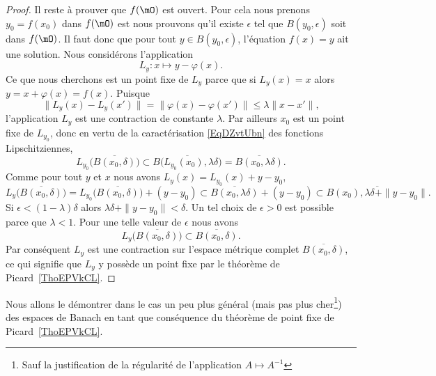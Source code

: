 \begin{proof}
    Il reste à prouver que \( f(\mO)\) est ouvert. Pour cela nous prenons \( y_0=f(x_0)\) dans \( f(\mO)\) est nous prouvons qu'il existe \( \epsilon\) tel que \( B(y_0,\epsilon)\) soit dans \( f(\mO)\). Il faut donc que pour tout \( y\in B(y_0,\epsilon)\), l'équation \( f(x)=y\) ait une solution. Nous considérons l'application
    \begin{equation}
        L_y\colon x\mapsto y-\varphi(x).
    \end{equation}
    Ce que nous cherchons est un point fixe de \( L_y\) parce que si \( L_y(x)=x\) alors \( y=x+\varphi(x)=f(x)\). Puisque
    \begin{equation}
        \big\| L_y(x)-L_y(x') \big\|=\big\| \varphi(x)-\varphi(x') \big\|\leq\lambda\| x-x' \|,
    \end{equation}
    l'application \( L_y\) est une contraction de constante \( \lambda\). Par ailleurs \( x_0\) est un point fixe de \( L_{y_0}\), donc en vertu de la caractérisation \eqref{EqDZvtUbn} des fonctions Lipschitziennes,
    \begin{equation}
        L_{y_0}\big( \overline{ B(x_0,\delta) } \big)\subset \overline{ B\big( L_{y_0}(x_0),\lambda\delta \big) }=\overline{ B(x_0,\lambda\delta) }.
    \end{equation}
    Comme pour tout \( y\) et \( x\) nous avons \( L_y(x)=L_{y_0}(x)+y-y_0\),
    \begin{equation}
        L_y\big( \overline{ B(x_0,\delta) } \big)=L_{y_0}\big( \overline{ B(x_0,\delta) } \big)+(y-y_0)\subset \overline{ B(x_0,\lambda\delta) }+(y-y_0)\subset \overline{ B(x_0),\lambda\delta+\| y-y_0 \| }.
    \end{equation}
    Si \( \epsilon<(1-\lambda)\delta\) alors \( \lambda\delta+\| y-y_0 \|<\delta\). Un tel choix de \( \epsilon>0\) est possible parce que \( \lambda<1\). Pour une telle valeur de \( \epsilon\) nous avons
    \begin{equation}
        L_y\big( \overline{ B(x_0,\delta) } \big)\subset \overline{ B(x_0,\delta) }.
    \end{equation}
    Par conséquent \( L_y\) est une contraction sur l'espace métrique complet \( \overline{ B(x_0,\delta) }\), ce qui signifie que \( L_y\) y possède un point fixe par le théorème de Picard~\ref{ThoEPVkCL}.
\end{proof}

Nous allons le démontrer dans le cas un peu plus général (mais pas plus cher\footnote{Sauf la justification de la régularité de l'application \( A\mapsto A^{-1}\)}) des espaces de Banach en tant que conséquence du théorème de point fixe de Picard~\ref{ThoEPVkCL}.

